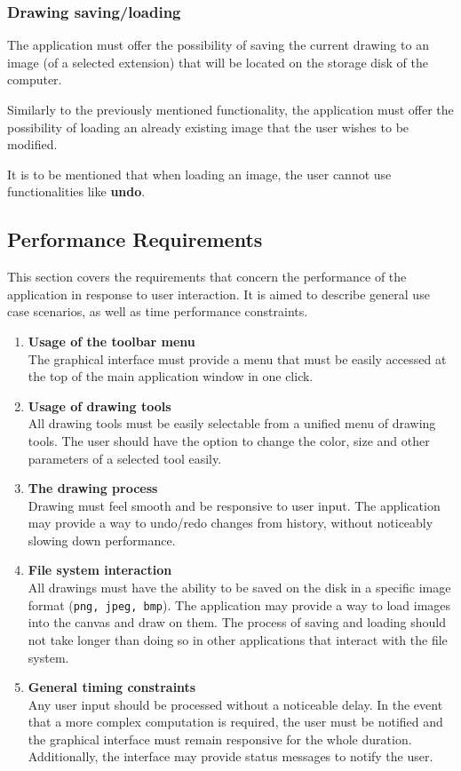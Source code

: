 \documentclass{article}
\begin{document}
\subsubsection{Drawing saving/loading}

The application must offer the possibility of saving the current drawing to an image (of a selected extension) that will be located on the storage disk of the computer.

Similarly to the previously mentioned functionality, the application must offer the possibility of loading an already existing image that the user wishes to be modified.

It is to be mentioned that when loading an image, the user cannot use functionalities like \textbf{undo}.

\subsection{Performance Requirements}
This section covers the requirements that concern the performance of the application in response to user interaction. It is aimed to describe general use case scenarios, as well as time performance constraints.
\begin{enumerate}
\item \textbf{Usage of the toolbar menu}
\\
The graphical interface must provide a menu that must be easily accessed at the top of the main application window in one click.
\item \textbf{Usage of drawing tools}
\\
All drawing tools must be easily selectable from a unified menu of drawing tools. The user should have the option to change the color, size and other parameters of a selected tool easily.
\item \textbf{The drawing process}
\\
Drawing must feel smooth and be responsive to user input. The application may provide a way to undo/redo changes from history, without noticeably slowing down performance.
\item \textbf{File system interaction}
\\
All drawings must have the ability to be saved on the disk in a specific image format (\texttt{png, jpeg, bmp}). The application may provide a way to load images into the canvas and draw on them. The process of saving and loading should not take longer than doing so in other applications that interact with the file system.
\item \textbf{General timing constraints}
\\
Any user input should be processed without a noticeable delay. In the event that a more complex computation is required, the user must be notified and the graphical interface must remain responsive for the whole duration. Additionally, the interface may provide status messages to notify the user.
\end{enumerate}
\end{document}
